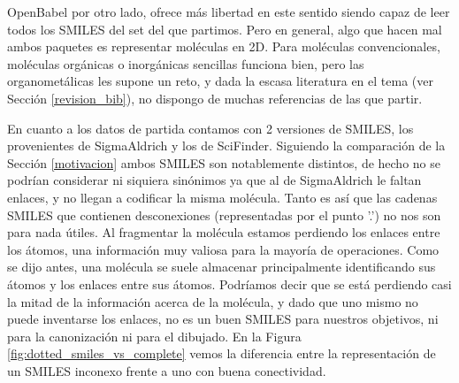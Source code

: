 OpenBabel por otro lado, ofrece más libertad en este sentido siendo capaz de leer todos los SMILES del set del que partimos. Pero en general, algo que hacen mal ambos paquetes es representar moléculas en 2D. Para moléculas convencionales, moléculas orgánicas o inorgánicas sencillas funciona bien, pero las organometálicas les supone un reto, y dada la escasa literatura en el tema (ver Sección \ref{revision_bib}), no dispongo de muchas referencias de las que partir.


En cuanto a los datos de partida contamos con 2 versiones de SMILES, los provenientes de SigmaAldrich y los de SciFinder. Siguiendo la comparación de la Sección \ref{motivacion} ambos SMILES son notablemente distintos, de hecho no se podrían considerar ni siquiera sinónimos ya que al de SigmaAldrich le faltan enlaces, y no llegan a codificar la misma molécula. Tanto es así que las cadenas SMILES que contienen desconexiones (representadas por el punto '.') no nos son para nada útiles. Al fragmentar la molécula estamos perdiendo los enlaces entre los átomos, una información muy valiosa para la mayoría de operaciones. Como se dijo antes, una molécula se suele almacenar principalmente identificando sus átomos y los enlaces entre sus átomos. Podríamos decir que se está perdiendo casi la mitad de la información acerca de la molécula, y dado que uno mismo no puede inventarse los enlaces, no es un buen SMILES para nuestros objetivos, ni para la canonización ni para el dibujado. En la Figura \ref{fig:dotted_smiles_vs_complete} vemos la diferencia entre la representación de un SMILES inconexo frente a uno con buena conectividad.


